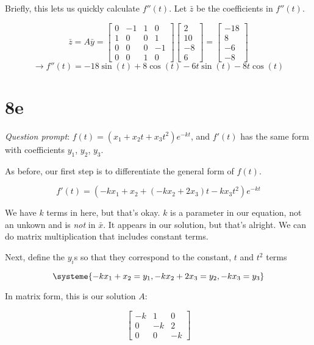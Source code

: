 \documentclass[12pt]{article}
\begin{document}
Briefly, this lets us quickly calculate $f''(t)$. Let $\bar{z}$ be the coefficients in $f''(t)$.

\[
  \bar{z} = A\bar{y} = 
  \begin{bmatrix}
    0 & -1 & 1 & 0 \\
    1 & 0 & 0 & 1 \\
    0 & 0 & 0 & -1 \\
    0 & 0 & 1 & 0 
  \end{bmatrix}
  \begin{bmatrix} 2 \\ 10 \\ -8 \\ 6 \end{bmatrix} = 
  \begin{bmatrix} -18 \\ 8 \\ -6 \\ -8 \end{bmatrix}
\]
\[
  \rightarrow f''(t) = -18\sin(t) + 8\cos(t) - 6t\sin(t) - 8t\cos(t)
\]

\section{8e}

\textit{Question prompt}: $f(t) = (x_1 + x_2t + x_3t^2)e^{-kt}$, and $f'(t)$ has the same
form with coefficients $y_1$, $y_2$, $y_3$.

As before, our first step is to differentiate the general form of $f(t)$.

\[
  f'(t) = (-kx_1 + x_2 + (-kx_2+2x_3)t - kx_3t^2)e^{-kt}
\]

We have $k$ terms in here, but that's okay. $k$ is a parameter in our equation, not an unkown and
is \textit{not} in $\bar{x}$. It appears in our solution, but that's alright. We can do matrix
multiplication that includes constant terms.

Next, define the $y_i$s so that they correspond to the constant, $t$ and $t^2$ terms

\[
  \systeme{-kx_1 + x_2 = y_1, -kx_2+2x_3 = y_2, -kx_3 = y_3}
\]

In matrix form, this is our solution $A$:

\[
  \begin{bmatrix}
    -k & 1 & 0 \\
    0 & -k & 2 \\
    0 & 0 & -k
  \end{bmatrix}
\]
\end{document}
